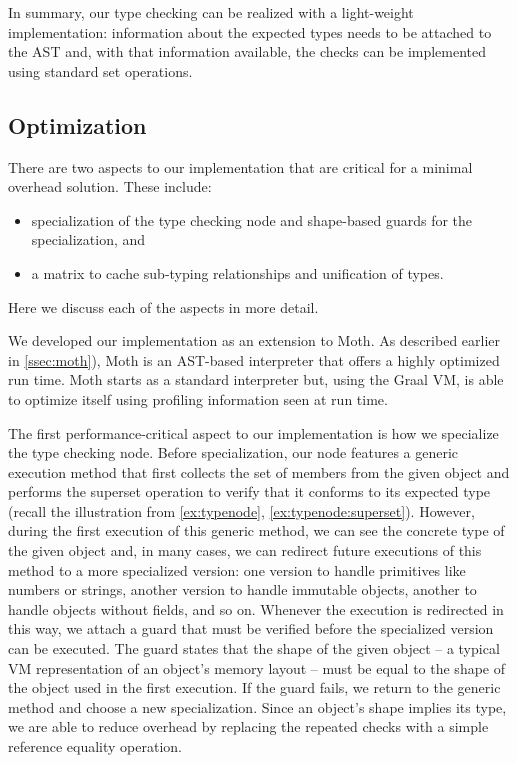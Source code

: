 In summary, our type checking can be realized with a light-weight implementation: 
information about the expected types needs to be attached to the AST and, 
with that information available,
the checks can be implemented using standard set operations.


\subsection{Optimization}
\label{ssec:optimization}

There are two aspects to our implementation that are critical for a minimal overhead solution. These include:

\begin{itemize}
  \item specialization of the type checking node and shape-based guards for the specialization, and
  \item a matrix to cache sub-typing relationships and unification of types.
\end{itemize}

Here we discuss each of the aspects in more detail.

We developed our implementation as an extension to Moth.
As described earlier in \cref{ssec:moth}),
Moth is an AST-based interpreter that offers a highly optimized run time.
Moth starts as a standard interpreter but,
using the Graal VM,
is able to optimize itself using profiling information seen at run time. 

The first performance-critical aspect to our implementation
is how we specialize the type checking node.
Before specialization,
our node features a generic execution method
that first collects the set of members
from the given object and performs the superset operation
to verify that it conforms to its expected type
(recall the illustration from \cref{ex:typenode},
\cref{ex:typenode:superset}).
However, during the first execution of this generic method,
we can see the concrete type of the given object and,
in many cases,
we can redirect future executions of this method to a more specialized version:
one version to handle primitives like numbers or strings,
another version to handle immutable objects,
another to handle objects without fields,
and so on.
Whenever the execution is redirected in this way,
we attach a guard that must be verified before the specialized version can be executed.
The guard states that the shape of the given object
-- a typical VM representation of an object's memory layout --
must be equal to the shape of the object
used in the first execution.
If the guard fails,
we return to the generic method and choose a new specialization.
Since an object's shape implies its type,
we are able to reduce overhead
by replacing the repeated checks
with a simple reference equality operation.

